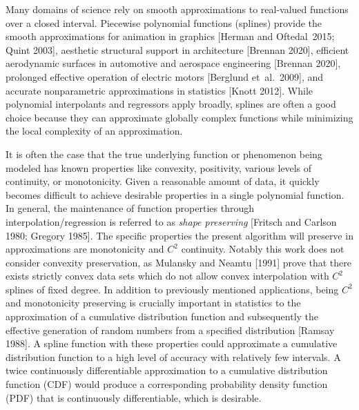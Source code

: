 
Many domains of science rely on smooth approximations to real-valued
functions over a closed interval. Piecewise polynomial functions
(splines) provide the smooth approximations for animation in graphics
[Herman and Oftedal\ 2015; Quint 2003], aesthetic structural support in
architecture [Brennan 2020], efficient aerodynamic surfaces in
automotive and aerospace engineering [Brennan 2020], prolonged
effective operation of electric motors [Berglund et\ al.\ 2009], and
accurate nonparametric approximations in statistics [Knott
2012]. While polynomial interpolants and regressors apply broadly,
splines are often a good choice because they can approximate globally
complex functions while minimizing the local complexity of an
approximation.

It is often the case that the true underlying function or phenomenon
being modeled has known properties like convexity, positivity,
various levels of continuity, or monotonicity. Given a reasonable
amount of data, it quickly becomes difficult to achieve desirable
properties in a single polynomial function. In general, the
maintenance of function properties through interpolation/regression is
referred to as {\it shape preserving} [Fritsch and Carlson 1980;
Gregory 1985]. The specific properties the present algorithm will
preserve in approximations are monotonicity and $C^2$ continuity. 
Notably this work does not consider convexity preservation, as Mulansky
and Neamtu [1991] prove that there exists strictly convex data sets which
do not allow convex interpolation with $C^2$ splines of fixed degree.
In addition to previously mentioned applications, being $C^2$ and monotonicity preserving is
crucially important in statistics to the approximation of a cumulative
distribution function and subsequently the effective generation of
random numbers from a specified distribution [Ramsay 1988].  A spline
function with these properties could approximate a cumulative
distribution function to a high level of accuracy with relatively few
intervals. A twice continuously differentiable approximation to a
cumulative distribution function (CDF) would produce a corresponding
probability density function (PDF) that is continuously
differentiable, which is desirable.

